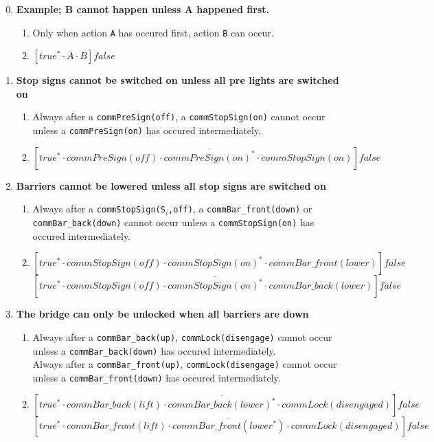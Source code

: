 \begin{enumerate}
  \setcounter{enumi}{-1}


  \item \textbf{Example; B cannot happen unless A happened first.}
  \begin{enumerate}
		\item Only when action \texttt{A} has occured first, action \texttt{B} can occur.
		\item $[true^* \cdot \overline{A} \cdot B]false$
	\end{enumerate}

	\item \textbf{Stop signs cannot be switched on unless all pre lights are switched on}
	\begin{enumerate}
		\item Always after a \texttt{commPreSign(off)}, a \texttt{commStopSign(on)} cannot occur unless a \texttt{commPreSign(on)} has occured intermediately.
		\item $[true^* \cdot commPreSign(off) \cdot \overline{commPreSign(on)^{*}} \cdot commStopSign(on)]false$
	\end{enumerate}

	\item \textbf{Barriers cannot be lowered unless all stop signs are switched on}
	\begin{enumerate}
		\item Always after a \texttt{commStopSign(S$_i$,off)}, a \texttt{commBar\_front(down)} or \texttt{commBar\_back(down)} cannot occur unless a \texttt{commStopSign(on)} has occured intermediately.
		\item $[true^* \cdot commStopSign(off) \cdot \overline{commStopSign(on)^{*}} \cdot commBar\_front(lower)]false$ \\
					$[true^* \cdot commStopSign(off) \cdot \overline{commStopSign(on)^{*}} \cdot commBar\_back(lower)]false$ \\
	\end{enumerate}

	\item \textbf{The bridge can only be unlocked when all barriers are down}
	\begin{enumerate}
		\item Always after a \texttt{commBar\_back(up)}, \texttt{commLock(disengage)} cannot occur unless a \texttt{commBar\_back(down)} has occured intermediately. \\
					Always after a \texttt{commBar\_front(up)}, \texttt{commLock(disengage)} cannot occur unless a \texttt{commBar\_front(down)} has occured intermediately.
		\item $[true^* \cdot commBar\_back(lift) \cdot \overline{commBar\_back(lower)^{*}} \cdot commLock(disengaged)]false$
					$[true^* \cdot commBar\_front(lift) \cdot \overline{commBar\_front(lower^{*})} \cdot commLock(disengaged)]false$
	\end{enumerate}


\end{enumerate}
